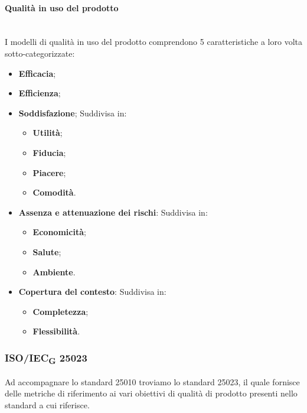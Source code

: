 \paragraph {Qualità in uso del prodotto}\mbox{}\\
I modelli di qualità in uso del prodotto comprendono 5 caratteristiche a loro volta sotto-categorizzate:
\begin{itemize}
	\item \textbf{Efficacia};
	\item \textbf{Efficienza};
	\item \textbf{Soddisfazione};
	Suddivisa in:
	\begin{itemize}
		\item \textbf{Utilità};
		\item \textbf{Fiducia};
		\item \textbf{Piacere};
		\item \textbf{Comodità}.
	\end{itemize}
	\item \textbf{Assenza e attenuazione dei rischi}: Suddivisa in:
	\begin{itemize}
		\item \textbf{Economicità};
		\item \textbf{Salute};
		\item \textbf{Ambiente}.
	\end{itemize}
	\item \textbf{Copertura del contesto}: Suddivisa in:
	\begin{itemize}
		\item \textbf{Completezza};
		\item \textbf{Flessibilità}.
	\end{itemize}
\end{itemize}
\subsubsection{ISO/IEC\textsubscript{G} 25023}
Ad accompagnare lo standard 25010 troviamo lo standard 25023, il quale fornisce delle metriche di riferimento ai vari obiettivi di qualità di prodotto presenti nello standard a cui riferisce.






